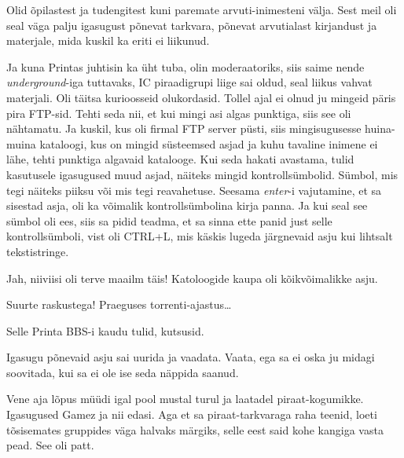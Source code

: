 
Olid õpilastest ja tudengitest kuni paremate arvuti-inimesteni välja. Sest meil 
oli seal väga palju igasugust põnevat tarkvara, põnevat arvutialast kirjandust 
ja materjale, mida kuskil ka eriti ei liikunud. 

Ja kuna Printas juhtisin ka üht tuba, olin moderaatoriks,  siis saime nende 
\emph{underground}-iga  tuttavaks, IC piraadigrupi liige sai oldud, 
seal liikus vahvat materjali. Oli täitsa kurioosseid olukordasid. Tollel ajal 
ei olnud ju mingeid päris pira FTP-sid. Tehti seda nii, et kui mingi asi algas 
punktiga, siis see oli nähtamatu. Ja kuskil, kus oli firmal FTP server püsti, 
siis mingisugusesse huina-muina kataloogi, kus on mingid süsteemsed asjad ja 
kuhu tavaline inimene ei lähe, tehti punktiga algavaid katalooge. Kui seda 
hakati avastama, tulid kasutusele igasugused muud asjad, näiteks mingid 
kontrollsümbolid. Sümbol, mis tegi näiteks piiksu või mis tegi reavahetuse. 
Seesama \emph{enter}-i vajutamine, et sa sisestad asja, oli ka võimalik 
kontrollsümbolina kirja panna. Ja kui seal see sümbol oli ees, siis sa pidid 
teadma, et sa sinna ette panid just selle kontrollsümboli, vist oli CTRL+L, mis 
käskis lugeda järgnevaid asju kui lihtsalt tekstistringe.

                 
Jah, niiviisi oli terve maailm täis! Katoloogide kaupa oli kõikvõimalikke asju.
                 

Suurte raskustega! Praeguses torrenti-ajastus\ldots


Selle Printa BBS-i kaudu tulid, kutsusid.

Igasugu põnevaid asju sai uurida ja vaadata. Vaata, ega sa ei oska ju midagi 
soovitada, kui sa ei ole ise seda näppida saanud.

Vene aja lõpus müüdi igal pool mustal turul ja laatadel piraat-kogumikke. 
Igasugused Gamez ja nii edasi. Aga et sa piraat-tarkvaraga raha teenid, loeti 
tõsisemates gruppides väga halvaks märgiks, selle eest said kohe kangiga vasta 
pead. See oli patt. 

